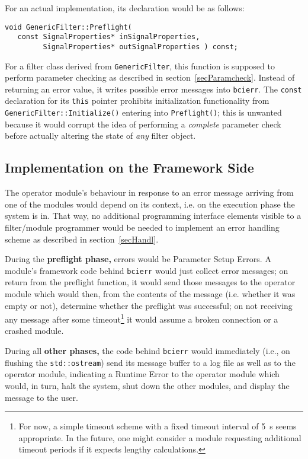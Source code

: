 \documentclass[12pt,a4paper]{article}
\begin{document}
For an actual implementation, its declaration would be as follows:
\begin{verbatim}
void GenericFilter::Preflight(
   const SignalProperties* inSignalProperties,
         SignalProperties* outSignalProperties ) const;
\end{verbatim}

For a filter class derived from
\texttt{GenericFilter}, this function is supposed to perform
parameter checking as described in section~\ref{secParamcheck}.
Instead of returning an error value, it writes possible error
messages into \texttt{bcierr}.
The \texttt{const} declaration for its \texttt{this} pointer
prohibits initialization functionality from
\texttt{GenericFilter::Initialize()} entering into
\texttt{Preflight()}; this is unwanted because it would
corrupt the idea of performing a \textit{complete} parameter check
before actually altering the state of \textit{any}
filter object.

\subsection{Implementation on the Framework Side}
\label{secImpl}

The operator module's behaviour in response to an error
message arriving from one of the modules would depend
on its context, i.e. on the execution phase the system is in.
That way, no additional programming interface elements
visible to a filter/module programmer
would be needed to implement an error handling scheme as
described in section~\ref{secHandl}. 

During the \textbf{preflight phase,} errors would be {Parameter
Setup Errors.} A module's framework code behind
\texttt{bcierr} would just collect error
messages; on return from the preflight function, it would
send those messages to the operator module which would then,
from the contents of the message (i.e. whether it was empty
or not), determine whether the preflight was successful;
on not receiving any message after some timeout\footnote{
For now, a simple timeout scheme with a fixed timeout
interval of 5~s seems appropriate. In the future, one might consider
a module requesting additional timeout periods if it expects 
lengthy calculations.}
it would assume a broken connection or a crashed module.

During all \textbf{other phases,} the code behind \texttt{bcierr}
would immediately (i.e., on flushing the \texttt{std::ostream})
send its message buffer to a log file as well as to
the operator module, indicating a {Runtime Error} 
to the operator module which would, in turn, halt the system,
shut down the other modules, and display the message to the
user.
\end{document}

